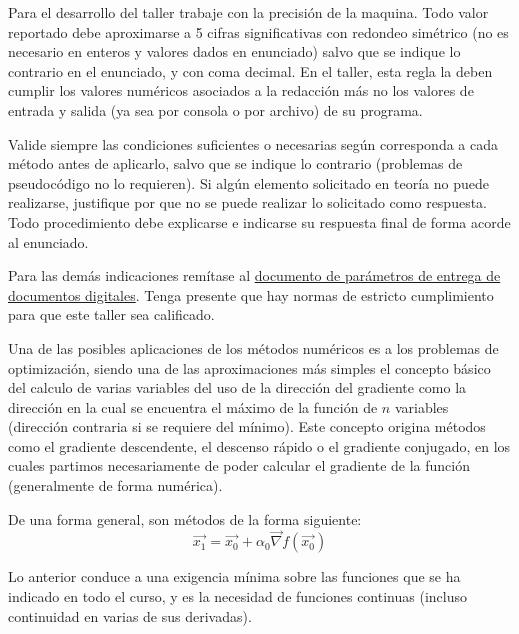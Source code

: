 \documentclass[12pt]{article}
\begin{document}
{\scriptsize





Para el desarrollo del taller trabaje con la precisión de la maquina. %
Todo valor reportado debe aproximarse a 5 cifras significativas con redondeo simétrico (no es necesario en enteros y valores dados en enunciado) salvo que se indique lo contrario en el enunciado, y con coma decimal.%
 En el taller, esta regla la deben cumplir los valores numéricos asociados a la redacción más no los valores de entrada y salida (ya sea por consola o por archivo) de su programa.%

Valide siempre las condiciones suficientes o necesarias según corresponda a cada método antes de aplicarlo, salvo que se indique lo contrario (problemas de pseudocódigo no lo requieren). Si algún elemento solicitado en teoría no puede realizarse, justifique por que no se puede realizar lo solicitado como respuesta. Todo procedimiento debe explicarse e indicarse su respuesta final de forma acorde al enunciado. %





Para las demás indicaciones remítase al \href{https://www.dropbox.com/s/noko8eysm8une33/CondicionesEntrega.pdf?dl=0}{documento de parámetros de entrega de documentos digitales}.  Tenga presente que hay normas de estricto cumplimiento para que este taller sea calificado.%
}




Una de las posibles aplicaciones de los métodos numéricos es a los problemas de optimización, siendo una de las aproximaciones más simples el concepto básico del calculo de varias variables del uso de la dirección del gradiente como la dirección en la cual se encuentra el máximo de la función de \(n\) variables (dirección contraria si se requiere del mínimo). Este concepto origina métodos como el gradiente descendente, el descenso rápido o el gradiente conjugado, en los cuales partimos necesariamente de poder calcular el gradiente de la función (generalmente de forma numérica).

De una forma general, son métodos de la forma siguiente: \[ \vec{x_1} = \vec{x_0}+\alpha_0\vec{\nabla}f(\vec{x_0}) \]

Lo anterior conduce a una exigencia mínima sobre las funciones que se ha indicado en todo el curso, y es la necesidad de funciones continuas (incluso continuidad en varias de sus derivadas).
\end{document}
